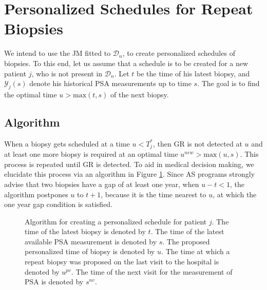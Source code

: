 \section{Personalized Schedules for Repeat Biopsies}
\label{sec : pers_sched_approaches}
We intend to use the JM fitted to $\mathcal{D}_n$, to create personalized schedules of biopsies. To this end, let us assume that a schedule is to be created for a new patient $j$, who is not present in $\mathcal{D}_n$. Let $t$ be the time of his latest biopsy, and $\mathcal{Y}_j(s)$ denote his historical PSA measurements up to time $s$. The goal is to find the optimal time $u > \mbox{max}(t,s)$ of the next biopsy.





\subsection{Algorithm}
\label{subsec : pers_sched_algorithm}
When a biopsy gets scheduled at a time $u < T^*_j$, then GR is not detected at $u$ and at least one more biopsy is required at an optimal time $u^{new} > \mbox{max}(u,s)$. This process is repeated until GR is detected. To aid in medical decision making, we elucidate this process via an algorithm in Figure \ref{fig : sched_algorithm}. Since AS programs strongly advise that two biopsies have a gap of at least one year, when $u - t < 1$, the algorithm postpones $u$ to $t + 1$, because it is the time nearest to $u$, at which the one year gap condition is satisfied.


\begin{figure}
\centerline{}
\caption{Algorithm for creating a personalized schedule for patient $j$. The time of the latest biopsy is denoted by $t$. The time of the latest available PSA measurement is denoted by $s$. The proposed personalized time of biopsy is denoted by $u$.  The time at which a repeat biopsy was proposed on the last visit to the hospital is denoted by $u^{pv}$. The time of the next visit for the measurement of PSA is denoted by $s^{nv}$.} 
\label{fig : sched_algorithm}
\end{figure}

